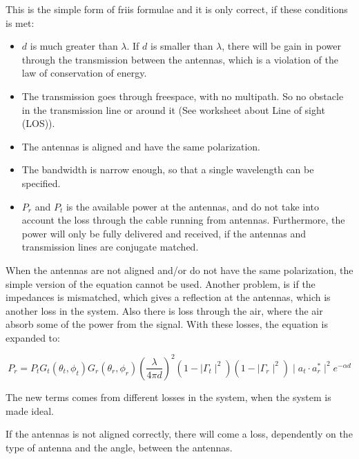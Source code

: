 This is the simple form of friis formulae and it is only correct, if these conditions is met:
\begin{itemize}
\item $d$ is much greater than $\lambda$. If $d$ is smaller than $\lambda$, there will be gain in power through the transmission between the antennas, which is a violation of the law of conservation of energy.
\item The transmission goes through freespace, with no multipath. So no obstacle in the transmission line or around it (See worksheet about Line of sight (LOS)).
\item The antennas is aligned and have the same polarization.
\item The bandwidth is narrow enough, so that a single wavelength can be specified.
\item $P_r$ and $P_t$ is the available power at the antennas, and do not take into account the loss through the cable running from antennas. Furthermore, the power will only be fully delivered and received, if the antennas and transmission lines are conjugate matched.
\end{itemize}


When the antennas are not aligned and/or do not have the same polarization, the simple version of the equation cannot be used. Another problem, is if the impedances is mismatched, which gives a reflection at the antennas, which is another loss in the system. Also there is loss through the air, where the air absorb some of the power from the signal. With these losses, the equation is expanded to:

\begin{equation}
P_r = P_t G_t(\theta_t, \phi_t) G_r(\theta_r, \phi_r) (\frac{\lambda}{4 \pi d})^2 (1 - \mid \Gamma_t \mid^2) (1 - \mid \Gamma_r \mid^2) \mid a_t \cdot a_r^* \mid^2 e^{- \alpha d}
\end{equation}
\begin{where}
\end{where}

The new terms comes from different losses in the system, when the system is made ideal.

If the antennas is not aligned correctly, there will come a loss, dependently on the type of antenna and the angle, between the antennas.



